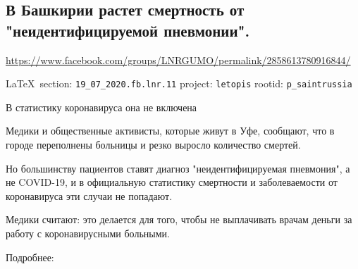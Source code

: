  
 
  
\subsection{В Башкирии растет смертность от "неидентифицируемой пневмонии".}
\url{https://www.facebook.com/groups/LNRGUMO/permalink/2858613780916844/}

\vspace{0.5cm}
{\small\LaTeX~section: \verb|19_07_2020.fb.lnr.11| project: \verb|letopis| rootid: \verb|p_saintrussia|}
\vspace{0.5cm}

В статистику коронавируса она не включена

Медики и общественные активисты, которые живут в Уфе, сообщают, что в городе переполнены больницы и резко выросло количество смертей.

Но большинству пациентов ставят диагноз "неидентифицируемая пневмония", а не COVID-19, и в официальную статистику смертности и заболеваемости от коронавируса эти случаи не попадают.

Медики считают: это делается для того, чтобы не выплачивать врачам деньги за работу с коронавирусными больными.

Подробнее: 
